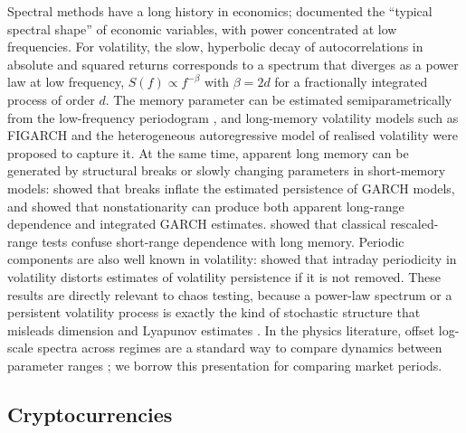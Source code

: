 \documentclass[11pt,a4paper]{article}
\begin{document}
Spectral methods have a long history in economics; \citet{Granger1966} documented the ``typical spectral shape''
of economic variables, with power concentrated at low frequencies. For volatility, the slow, hyperbolic decay of
autocorrelations in absolute and squared returns \citep{DingGrangerEngle1993} corresponds to a spectrum that
diverges as a power law at low frequency, $S(f)\propto f^{-\beta}$ with $\beta = 2d$ for a fractionally integrated
process of order $d$. The memory parameter can be estimated semiparametrically from the low-frequency periodogram
\citep{GewekePorterHudak1983}, and long-memory volatility models such as FIGARCH \citep{Baillie1996} and the
heterogeneous autoregressive model of realised volatility \citep{Corsi2009,Andersen2003} were proposed to capture
it. At the same time, apparent long memory can be generated by structural breaks or slowly changing parameters in
short-memory models: \citet{LamoureuxLastrapes1990} showed that breaks inflate the estimated persistence of GARCH
models, and \citet{MikoschStarica2004} showed that nonstationarity can produce both apparent long-range dependence
and integrated GARCH estimates. \citet{Lo1991} showed that classical rescaled-range tests confuse short-range
dependence with long memory. Periodic components are also well known in volatility: \citet{AndersenBollerslev1997}
showed that intraday periodicity in volatility distorts estimates of volatility persistence if it is not removed.
These results are directly relevant to chaos testing, because a power-law spectrum or a persistent volatility
process is exactly the kind of stochastic structure that misleads dimension and Lyapunov estimates
\citep{OsborneProvenzale1989}. In the physics literature, offset log-scale spectra across regimes are a standard way
to compare dynamics between parameter ranges \citep[e.g.][]{KailashamKhair2023}; we borrow this presentation for
comparing market periods.

\subsection{Cryptocurrencies}
\end{document}

